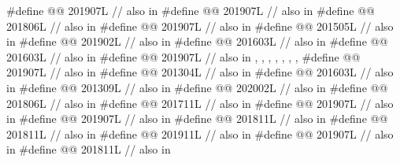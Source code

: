 \begin{codeblock}
#define @@                           201907L // also in 
#define @@                        201907L // also in 
#define @@                          201806L // also in 
#define @@                            201907L // also in 
#define @@                     201505L // also in 
#define @@              201902L // also in 
#define @@              201603L // also in 
#define @@                              201603L // also in 
#define @@                           201907L
  // also in , , , , , , , 
#define @@                            201907L // also in 
#define @@                       201304L // also in 
#define @@                             201603L // also in 
#define @@                      201309L // also in 
#define @@                          202002L // also in 
#define @@              201806L // also in 
#define @@                 201711L // also in 
#define @@           201907L // also in 
#define @@              201907L // also in 
#define @@                201811L // also in 
#define @@                  201811L // also in 
#define @@                 201911L // also in 
#define @@                  201907L // also in 
#define @@             201811L // also in 

\end{codeblock}
